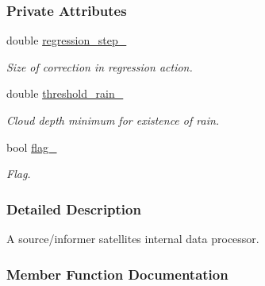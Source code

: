 \subsubsection*{Private Attributes}
\begin{DoxyCompactItemize}
\item 
\mbox{\label{classosse_1_1collaborate_1_1_data_processor_source_a676104998e0edb31c85f3ace7408ea30}} 
double \hyperlink{classosse_1_1collaborate_1_1_data_processor_source_a676104998e0edb31c85f3ace7408ea30}{regression\+\_\+step\+\_\+}
\begin{DoxyCompactList}\small\item\em Size of correction in regression action. \end{DoxyCompactList}\item 
\mbox{\label{classosse_1_1collaborate_1_1_data_processor_source_a987bff6789aae12fa88d317347304beb}} 
double \hyperlink{classosse_1_1collaborate_1_1_data_processor_source_a987bff6789aae12fa88d317347304beb}{threshold\+\_\+rain\+\_\+}
\begin{DoxyCompactList}\small\item\em Cloud depth minimum for existence of rain. \end{DoxyCompactList}\item 
\mbox{\label{classosse_1_1collaborate_1_1_data_processor_source_a9644f1ea065308146c05106d13dc2ccc}} 
bool \hyperlink{classosse_1_1collaborate_1_1_data_processor_source_a9644f1ea065308146c05106d13dc2ccc}{flag\+\_\+}
\begin{DoxyCompactList}\small\item\em Flag. \end{DoxyCompactList}\end{DoxyCompactItemize}


\subsubsection{Detailed Description}
A source/informer satellite\textquotesingle{}s internal data processor. 

\subsubsection{Member Function Documentation}
\mbox{\label{classosse_1_1collaborate_1_1_data_processor_source_a625d453c95bf1491290afdd0b85d4681}} 
